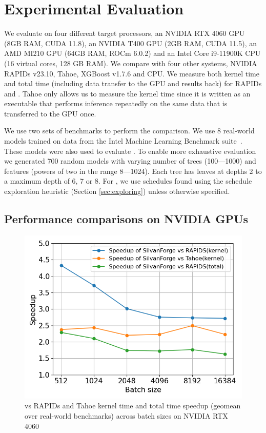 \section{Experimental Evaluation}
\label{sec:results}

We evaluate \Treebeard{} on four different target processors, an NVIDIA RTX 4060 GPU (8GB RAM, CUDA 11.8),
an NVIDIA T400 GPU (2GB RAM, CUDA 11.5), an AMD MI210 GPU (64GB RAM, ROCm 6.0.2) and an 
Intel Core i9-11900K CPU (16 virtual cores, 128 GB RAM). We compare \Treebeard{} with 
four other systems, NVIDIA RAPIDs v23.10, Tahoe, XGBoost v1.7.6 and \TreebeardOLD{} CPU. 
We measure both kernel time and total time (including data transfer to the GPU and results back) 
for RAPIDs and \Treebeard{}. Tahoe only allows us to measure the kernel time since it is written
as an executable that performs inference repeatedly on the same data that is transferred to the GPU once.

We use two sets of benchmarks to perform the comparison.
We use 8 real-world models trained on data from the Intel Machine 
Learning Benchmark suite~\cite{MLBenchmarks}. These models were also
used to evaluate \TreebeardOLD{}\cite{Treebeard}.
To enable more exhaustive evaluation we generated 700 random models with
varying number of trees (100---1000) and features (powers of two in the range 8---1024). 
Each tree has leaves at depths 2 to a maximum depth of 6, 7 or 8.
For \Treebeard{}, we use schedules found using the schedule exploration
heuristic (Section \ref{sec:exploring}) unless otherwise specified.

\subsection{Performance comparisons on NVIDIA GPUs}

\begin{figure}[htb]
  \centering
  \includegraphics[width=0.75\linewidth]{figures/geomean_speedup_4060_kernel_time_total_time.png}
  \caption{\Treebeard{} vs RAPIDs and Tahoe kernel time and total time speedup (geomean over real-world 
  benchmarks) across batch sizes on NVIDIA RTX 4060}
  \label{Fig:TBvsRAPIDsTahoe_4060_Speedup}
\end{figure}

